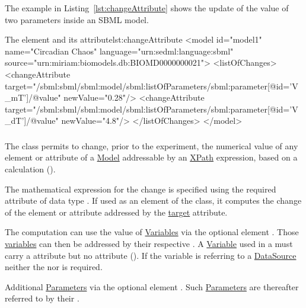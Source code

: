 The example in Listing~\ref{lst:changeAttribute} shows the update of the value of two parameters inside an SBML model.

\begin{myXmlLst}{The  element and its  attribute}{lst:changeAttribute}
<model id="model1" name="Circadian Chaos" language="urn:sedml:language:sbml" 
	source="urn:miriam:biomodels.db:BIOMD0000000021">
	<listOfChanges>
		<changeAttribute target="/sbml:sbml/sbml:model/sbml:listOfParameters/sbml:parameter[@id='V_mT']/@value" newValue="0.28"/>
  		<changeAttribute target="/sbml:sbml/sbml:model/sbml:listOfParameters/sbml:parameter[@id='V_dT']/@value" newValue="4.8"/>
	</listOfChanges>
</model>
\end{myXmlLst}


\subsubsection{}
\label{class:computeChange}
The  class permits to change, prior to the experiment, the numerical value of any element or attribute of a \hyperref[class:model]{Model} addressable by an \hyperref[sec:xpath]{XPath} expression, based on a calculation ().

The mathematical expression for the change is specified using the required \hyperref[sec:math]{} attribute of data type \hyperref[type:mathml]{}. If used as an element of the  class, it computes the change of the element or attribute addressed by the \hyperref[sec:changeTarget]{target} attribute.

The computation can use the value of \hyperref[class:variable]{Variables} via the optional element \hyperref[sec:listOfVariables]{}. Those \hyperref[class:variable]{variables} can then be addressed by their respective \hyperref[sec:id]{}. A \hyperref[class:variable]{Variable} used in a  must carry a \hyperref[sec:modelReference]{} attribute but no \hyperref[sec:taskReference]{} attribute (). If the variable is referring to a \hyperref[class:dataSource]{DataSource} neither the \hyperref[sec:modelReference]{} nor \hyperref[sec:taskReference]{} is required.

Additional \hyperref[class:parameter]{Parameters} via the optional element \hyperref[sec:listOfParameters]{}. Such \hyperref[class:parameter]{Parameters} are thereafter referred to by their \hyperref[sec:id]{}. 

